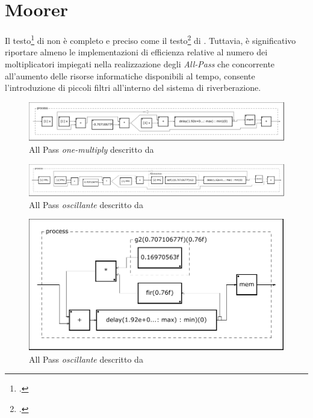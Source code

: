 \section{Moorer}

Il testo\footcite{jm:rev} di \jam non è completo e preciso come il
testo\footcite{ms:rev62} di \ms. Tuttavia, è significativo riportare almeno
le implementazioni di efficienza relative al numero dei moltiplicatori impiegati
nella realizzazione degli \emph{All-Pass} che concorrente all'aumento delle
risorse informatiche disponibili al tempo, consente l'introduzione di piccoli
filtri all'interno del sistema di riverberazione.



\begin{figure}[htp]
\centering
\includegraphics[width=1\textwidth]{Code/amapf-svg/process.pdf}
\caption{All Pass \emph{one-multiply} descritto da \jam}
\label{fig:amapf}
\end{figure}



\begin{figure}[htp]
\centering
\includegraphics[width=1\textwidth]{Code/amapfo-svg/process.pdf}
\caption{All Pass \emph{oscillante} descritto da \jam}
\label{fig:amapfo}
\end{figure}



\begin{figure}[htp]
\centering
\includegraphics[width=1\textwidth]{Code/amcomblp-svg/process.pdf}
\caption{All Pass \emph{oscillante} descritto da \jam}
\label{fig:amcombfir}
\end{figure}

